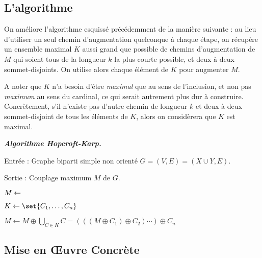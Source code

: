  \subsection{L'algorithme}
 
 On améliore l'algorithme esquissé précédemment de la manière suivante : au lieu d'utiliser un seul chemin d'augmentation quelconque à chaque étape, on récupère un ensemble maximal $K$ aussi grand que possible de chemins d'augmentation de $M$ qui soient tous de la longueur $k$ la plus courte possible, et deux à deux sommet-disjoints. On utilise alors chaque élément de $K$ pour augmenter $M$.
 
 A noter que $K$ n'a besoin d'être \emph{maximal} que au sens de l'inclusion, et non pas \emph{maximum} au sens du cardinal, ce qui serait autrement plus dur à construire. Concrètement, s'il n'existe pas d'autre chemin de longueur $k$ et deux à deux sommet-disjoint de tous les éléments de $K$, alors on considèrera que $K$ est maximal.
 
 
 \SEP \emph{\bfseries Algorithme Hopcroft-Karp.}
    
    Entrée : Graphe biparti simple non orienté $G = (V,E) = (X \cup Y, E)$.
    
    Sortie : Couplage maximum $M$ de $G$.
    \bigskip
    
    $M \leftarrow \empty$

    
    
    \hspace{2em} $K \leftarrow \set{C_1,\dots,C_n}$
    
        
    \hspace{2em} 
    
    \hspace{2em} 
    
    \hspace{2em}  
    
    \hspace{2em} $ M \leftarrow M \oplus \bigcup_{C \in K} C = (((M \oplus C_1) \oplus C_2) \cdots ) \oplus C_n$
    
     
    
 \SEP
 
  \subsection{Mise en Œuvre Concrète}
 
